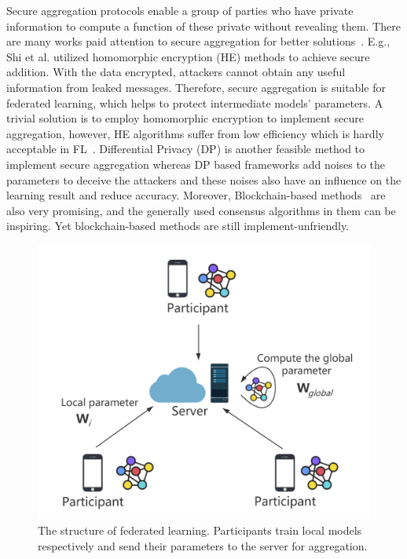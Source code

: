 Secure aggregation protocols enable a group of parties who have private information to compute a function of these private without revealing them. There are many works paid attention to secure aggregation for better solutions~\cite{shi2011privacy,RobustAgg,Bonawitz19,Nike,PrivFL}. E.g., Shi et al.\cite{shi2011privacy} utilized homomorphic encryption (HE) methods to achieve secure addition. With the data encrypted, attackers cannot obtain any useful information from leaked messages. Therefore, secure aggregation is suitable for federated learning, which helps to protect intermediate models' parameters. A trivial solution is to employ homomorphic encryption to implement secure aggregation, however, HE algorithms suffer from low efficiency which is hardly acceptable in FL~\cite{HESurvey}. Differential Privacy (DP) is another feasible method to implement secure aggregation whereas DP based frameworks add noises to the parameters to deceive the attackers and these noises also have an influence on the learning result and reduce accuracy. Moreover, Blockchain-based methods~\cite{DeepChain,Lu2020,On-Device} are also very promising, and the generally used consensus algorithms in them can be inspiring. Yet blockchain-based methods are still implement-unfriendly. 

\begin{figure}[!ht]
    \centering
    \includegraphics[width=\columnwidth]{img/fed.png}
    \caption{The structure of federated learning. Participants train local models respectively and send their parameters to the server for aggregation.}
    \label{fed}
\end{figure}


